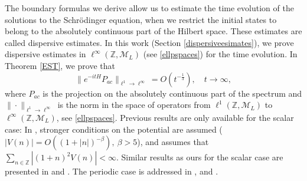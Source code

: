 \documentclass[12pt,oneside,onecolumn,open]{article}
\begin{document}

The boundary formulas we derive allow us to estimate the time evolution of the solutions to the Schr\"odinger equation, when we restrict the initial states to belong to the absolutely continuous part of the Hilbert space. These estimates are called dispersive estimates. In this work (Section \ref{dispersiveesimates}), we prove dispersive estimates in $ \ell^\infty(\mathbb{Z}, \mathcal{M}_L) $ (see \eqref{ellpspaces}) for the time evolution. In Theorem \ref{EST}, we prove that
\begin{equation}
\label{eq:decay}
    \|e^{-itH}P_{ac}\|_{\ell^{1} \to \ell^{\infty}} = O(t^{-\frac{1}{3}}), \quad t \to \infty,
\end{equation}
where $P_{ac}$ is the projection on the absolutely continuous part of the spectrum and $ \| \cdot \|_{\ell^{1} \to \ell^{\infty}} $ is the norm in the space of operators from $ \ell^1(\mathbb{Z}, \mathcal{M}_L)$ to $ \ell^\infty(\mathbb{Z}, \mathcal{M}_L)$, see \eqref{ellpspaces}. Previous results are only available for the scalar case: In \cite{MR2468536}, stronger conditions on the potential are assumed ($ |V(n)| = O((1 + |n|)^{-\beta}), \: \beta > 5$), and \cite{MR2529950} assumes that $ \sum_{n \in \mathbb{Z}} |(1 + n)^{2}V(n)| < \infty $. Similar results as ours for the scalar case are presented in \cite{MR3433284} and \cite{MR3404595}. The periodic case is addressed in \cite{MR4070305}, \cite{MR4335875} and \cite{MR4944037}.
\end{document}
